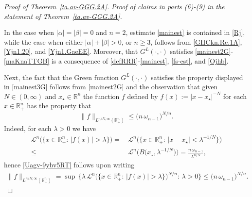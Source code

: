 \documentclass[11pt,reqno]{amsart}
\numberwithin{equation}{section}
\theoremstyle{remark}
\begin{document}
\begin{proof}[Proof of Theorem~\ref{ta.av-GGG.2A}]
\vskip 0.08in
 \textit{Proof of claims in parts {\it (6)}-{\it (9)} in the statement
of Theorem~\ref{ta.av-GGG.2A}.}
\vskip 0.08in

In the case when $|\alpha|=|\beta|=0$ and $n=2$, estimate \eqref{mainest} 
is contained in \eqref{Rj}, while the case when either $|\alpha|+|\beta|>0$, or 
$n\geq 3$, follows from \eqref{GHCkn.Re.1A}, \eqref{Yjn1.20}, and \eqref{Yjn1.GaeEE}.
Moreover, that $G^L(\cdot,\cdot)$ satisfies \eqref{mainest2G}-\eqref{maKnaTTGB}
is a consequence of \eqref{defRRR}-\eqref{mainest}, \eqref{fs-est}, 
and \eqref{Ojhb}.

Next, the fact that the Green function $G^L(\cdot,\cdot)$ satisfies the 
property displayed in \eqref{mainest3G} follows from \eqref{mainest2G}
and the observation that given $N\in(0,\infty)$ and $x_\star\in{\mathbb{R}}^n$ the 
function $f$ defined by $f(x):=|x-x_\star|^{-N}$ for each $x\in{\mathbb{R}}^n_{+}$ 
has the property that
%
\begin{equation}\label{Uagv-9ybv5RT}
\|f\|_{L^{n/N,\infty}({\mathbb{R}}^n_{+})}\leq\big(n\,\omega_{n-1}\big)^{N/n}.
\end{equation}
%
Indeed, for each $\lambda>0$ we have 
%
\begin{align}\label{Uagv-9ybv5RT.2}
{\mathscr{L}}^n\Big(\big\{x\in{\mathbb{R}}^n_{+}:\,|f(x)|>\lambda\big\}\Big)
=&\,{\mathscr{L}}^n\Big(\big\{x\in{\mathbb{R}}^n_{+}:\,|x-x_\star|<\lambda^{-1/N}
\big\}\Big)
\nonumber\\[4pt]
\leq &\,{\mathscr{L}}^n\Big(B\big(x_\star,\lambda^{-1/N}\big)\Big)
=\frac{n\,\omega_{n-1}}{\lambda^{n/N}},
\end{align}
%
hence \eqref{Uagv-9ybv5RT} follows upon writing  
%
\begin{align}\label{Uagv-9ybv5RT.3}
\|f\|_{L^{n/N,\infty}({\mathbb{R}}^n_{+})}
=\sup\,\Big\{\lambda\,{\mathscr{L}}^n\Big(\big\{x\in{\mathbb{R}}^n_{+}:\,
|f(x)|>\lambda\big\}\Big)^{N/n}:\,\lambda>0\Big\}\leq\big(n\,\omega_{n-1}\big)^{N/n}.
\end{align}


\end{proof}
\end{document}
